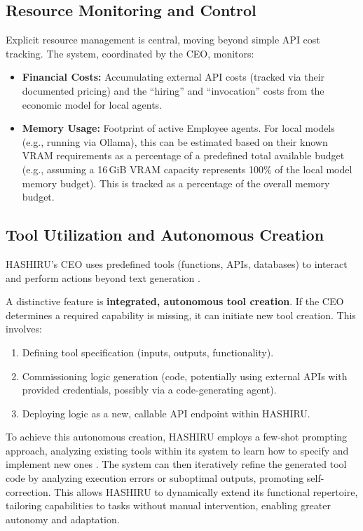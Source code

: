 \documentclass[conference]{IEEEtran}
\begin{document}
\subsection{Resource Monitoring and Control}
\label{subsec:resource_mgmt}
Explicit resource management is central, moving beyond simple API cost tracking. The system, coordinated by the CEO, monitors:
\begin{itemize}
    \item \textbf{Financial Costs:} Accumulating external API costs (tracked via their documented pricing) and the ``hiring'' and ``invocation'' costs from the economic model for local agents.
    \item \textbf{Memory Usage:} Footprint of active Employee agents. For local models (e.g., running via Ollama), this can be estimated based on their known VRAM requirements as a percentage of a predefined total available budget (e.g., assuming a 16\,GiB VRAM capacity represents 100\% of the local model memory budget). This is tracked as a percentage of the overall memory budget.
\end{itemize}
\subsection{Tool Utilization and Autonomous Creation}
\label{subsec:tooling}
HASHIRU's CEO uses predefined tools (functions, APIs, databases) to interact and perform actions beyond text generation \cite{yao2022react, openai_func_calling}.

A distinctive feature is \textbf{integrated, autonomous tool creation}. If the CEO determines a required capability is missing, it can initiate new tool creation. This involves:
\begin{enumerate}
    \item Defining tool specification (inputs, outputs, functionality).
    \item Commissioning logic generation (code, potentially using external APIs with provided credentials, possibly via a code-generating agent).
    \item Deploying logic as a new, callable API endpoint within HASHIRU.
\end{enumerate}
To achieve this autonomous creation, HASHIRU employs a few-shot prompting approach, analyzing existing tools within its system to learn how to specify and implement new ones \cite{brown2020language}. The system can then iteratively refine the generated tool code by analyzing execution errors or suboptimal outputs, promoting self-correction. This allows HASHIRU to dynamically extend its functional repertoire, tailoring capabilities to tasks without manual intervention, enabling greater autonomy and adaptation.
\end{document}
